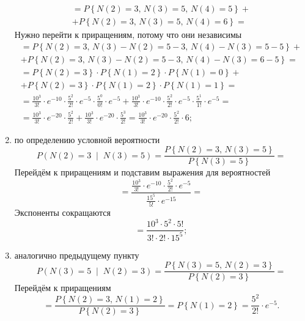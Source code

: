 \begin{enumerate}[label=\alph*)]
\begin{gather*}
    = P \left\{
      N \left( 2 \right) = 3, \, N \left( 3 \right) = 5, \, N \left( 4 \right) = 5 \right\} + \\
    + P \left\{
      N \left( 2 \right) = 3, \, N \left( 3 \right) = 5, \, N \left( 4 \right) = 6 \right\} =
  \end{gather*}
  Нужно перейти к приращениям, потому что они независимы
  \begin{gather*}
    = P \left\{
      N \left( 2 \right) = 3, \, N \left( 3 \right) - N \left( 2 \right) = 5 - 3, \,
      N \left( 4 \right) - N \left( 3 \right) = 5 - 5 \right\} + \\
    + P \left\{
      N \left( 2 \right) = 3, \, N \left( 3 \right) - N \left( 2 \right) = 5 - 3, \,
      N \left( 4 \right) - N \left( 3 \right) = 6 - 5 \right\} = \\
    = P \left\{ N \left( 2 \right) = 3 \right\} \cdot P \left\{ N \left( 1 \right) = 2 \right\} \cdot
    P \left\{ N \left( 1 \right) = 0 \right\} + \\
    + P \left\{ N \left( 2 \right) = 3 \right\} \cdot P \left\{ N \left( 1 \right) = 2 \right\} \cdot
    P \left\{ N \left( 1 \right) = 1 \right\} = \\
    = \frac{10^3}{3!} \cdot e^{-10} \cdot \frac{5^2}{2!} \cdot e^{-5} \cdot \frac{5^0}{0!} \cdot
    e^{-5} +
    \frac{10^3}{3!} \cdot e^{-10} \cdot \frac{5^2}{2!} \cdot e^{-5} \cdot \frac{5^1}{1!} \cdot
    e^{-5} = \\
    = \frac{10^3}{3!} \cdot e^{-20} \cdot \frac{5^2}{2!} +
    \frac{10^3}{3!} \cdot e^{-20} \cdot \frac{5^3}{2!} =
    \frac{10^3}{3!} \cdot e^{-20} \cdot \frac{5^2}{2!} \cdot 6;
  \end{gather*}
  \item по определению условной вероятности
  $$P \left( N \left( 2 \right) = 3 \; \middle| \; N \left( 3 \right) = 5 \right) =
    \frac{P \left\{ N \left( 2 \right) = 3, \, N \left( 3 \right) = 5 \right\} }{P \left\{ N \left( 3 \right) = 5 \right\} } =$$
  Перейдём к приращениям и подставим выражения для вероятностей
  $$= \frac{ \frac{10^3}{3!} \cdot e^{-10} \cdot \frac{5^2}{2!} \cdot e^{-5}}{ \frac{15^5}{5!} \cdot e^{-15}} =$$
  Экспоненты сокращаются
  $$= \frac{10^3 \cdot 5^2 \cdot 5!}{3! \cdot 2! \cdot 15^5};$$
  \item аналогично предыдущему пункту
  $$P \left( N \left( 3 \right) = 5 \; \middle| \; N \left( 2 \right) = 3 \right) =
    \frac{P \left\{ N \left( 3 \right) = 5, \, N \left( 2 \right) = 3 \right\} }{P \left\{ N \left( 2 \right) = 3 \right\} } =$$
  Перейдём к приращениям
  $$= \frac{P \left\{ N \left( 2 \right) = 3, \, N \left( 1 \right) = 2 \right\} }{P \left\{ N \left( 2 \right) = 3 \right\} } =
    P \left\{ N \left( 1 \right) = 2 \right\} =
    \frac{5^2}{2!} \cdot e^{-5}.$$
\end{enumerate}

